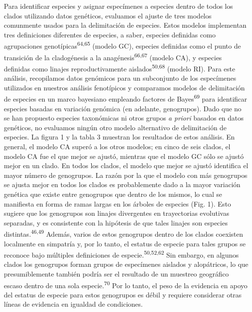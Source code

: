 \documentclass[
  11pt,
]{article}
\begin{document}
Para identificar especies y asignar especímenes a especies dentro de todos los clados utilizando datos genéticos, evaluamos el ajuste de tres modelos comunmente usados para la delimitación de especies. Estos modelos implementan tres definiciones diferentes de especies, a saber, especies definidas como agrupaciones genotípicas\textsuperscript{64,65} (modelo GC), especies definidas como el punto de transición de la cladogénesis a la anagénesis\textsuperscript{66,67} (modelo CA), y especies definidas como linajes reproductivamente aislados\textsuperscript{50,68} (modelo RI). Para este análisis, recopilamos datos genómicos para un subconjunto de los especímenes utilizados en nuestros análisis fenotípicos y comparamos modelos de delimitación de especies en un marco bayesiano empleando factores de Bayes\textsuperscript{69} para identificar especies basadas en variación genómica (en adelante, genogrupos). Dado que no se han propuesto especies taxonómicas ni otros grupos \emph{a priori} basados en datos genéticos, no evaluamos ningún otro modelo alternativo de delimitación de especies. La figura 1 y la tabla 3 muestran los resultados de estos análisis. En general, el modelo CA superó a los otros modelos; en cinco de seis clados, el modelo CA fue el que mejor se ajustó, mientras que el modelo GC sólo se ajustó mejor en un clado. En todos los clados, el modelo que mejor se ajustó identifica el mayor número de genogrupos. La razón por la que el modelo con más genogrupos se ajusta mejor en todos los clados es probablemente dado a la mayor variación genética que existe entre genogrupos que dentro de los mismos, lo cual se manifiesta en forma de ramas largas en los árboles de especies (Fig. 1). Esto sugiere que los genogrupos son linajes divergentes en trayectorias evolutivas separadas, y es consistente con la hipótesis de que tales linajes son especies distintas.\textsuperscript{46,49} Además, varios de estos genogrupos dentro de los clados coexisten localmente en simpatría y, por lo tanto, el estatus de especie para tales grupos se reconoce bajo múltiples definiciones de especie.\textsuperscript{50,52,62} Sin embargo, en algunos clados los genogrupos forman grupos de especímenes aislados y alopátricos, lo que presumiblemente también podría ser el resultado de un muestreo geográfico escaso dentro de una sola especie.\textsuperscript{70} Por lo tanto, el peso de la evidencia en apoyo del estatus de especie para estos genogrupos es débil y requiere considerar otras líneas de evidencia en igualdad de condiciones.
\end{document}
